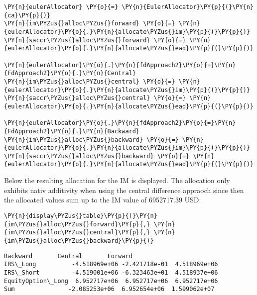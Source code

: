     \begin{tcolorbox}[breakable, size=fbox, boxrule=1pt, pad at break*=1mm,colback=cellbackground, colframe=cellborder]
\begin{Verbatim}[commandchars=\\\{\}]
\PY{n}{eulerAllocator} \PY{o}{=} \PY{n}{EulerAllocator}\PY{p}{(}\PY{n}{ca}\PY{p}{)}
\PY{n}{im\PYZus{}alloc\PYZus{}forward} \PY{o}{=} \PY{n}{eulerAllocator}\PY{o}{.}\PY{n}{allocate\PYZus{}im}\PY{p}{(}\PY{p}{)}
\PY{n}{saccr\PYZus{}alloc\PYZus{}forward} \PY{o}{=} \PY{n}{eulerAllocator}\PY{o}{.}\PY{n}{allocate\PYZus{}ead}\PY{p}{(}\PY{p}{)}

\PY{n}{eulerAllocator}\PY{o}{.}\PY{n}{fdApproach2}\PY{o}{=}\PY{n}{FdApproach2}\PY{o}{.}\PY{n}{Central}
\PY{n}{im\PYZus{}alloc\PYZus{}central} \PY{o}{=} \PY{n}{eulerAllocator}\PY{o}{.}\PY{n}{allocate\PYZus{}im}\PY{p}{(}\PY{p}{)}
\PY{n}{saccr\PYZus{}alloc\PYZus{}central} \PY{o}{=} \PY{n}{eulerAllocator}\PY{o}{.}\PY{n}{allocate\PYZus{}ead}\PY{p}{(}\PY{p}{)}

\PY{n}{eulerAllocator}\PY{o}{.}\PY{n}{fdApproach2}\PY{o}{=}\PY{n}{FdApproach2}\PY{o}{.}\PY{n}{Backward}
\PY{n}{im\PYZus{}alloc\PYZus{}backward} \PY{o}{=} \PY{n}{eulerAllocator}\PY{o}{.}\PY{n}{allocate\PYZus{}im}\PY{p}{(}\PY{p}{)}
\PY{n}{saccr\PYZus{}alloc\PYZus{}backward} \PY{o}{=} \PY{n}{eulerAllocator}\PY{o}{.}\PY{n}{allocate\PYZus{}ead}\PY{p}{(}\PY{p}{)}
\end{Verbatim}
\end{tcolorbox}

    Below the resulting allocation for the IM is displayed. The allocation
only exhibits nativ additivity when using the central difference
appraoch since then the allocated values sum up to the IM value of
6952717.39 USD.

    
    \begin{tcolorbox}[breakable, size=fbox, boxrule=1pt, pad at break*=1mm,colback=cellbackground, colframe=cellborder]
\begin{Verbatim}[commandchars=\\\{\}]
\PY{n}{display\PYZus{}table}\PY{p}{(}\PY{n}{im\PYZus{}alloc\PYZus{}forward}\PY{p}{,} \PY{n}{im\PYZus{}alloc\PYZus{}central}\PY{p}{,} \PY{n}{im\PYZus{}alloc\PYZus{}backward}\PY{p}{)}
\end{Verbatim}
\end{tcolorbox}

            \begin{tcolorbox}[breakable, size=fbox, boxrule=.5pt, pad at break*=1mm, opacityfill=0]
\begin{Verbatim}[commandchars=\\\{\}]
                       Backward       Central       Forward
IRS\_Long          -4.518969e+06 -2.421718e-01  4.518969e+06
IRS\_Short         -4.519001e+06 -6.323463e+01  4.518937e+06
EquityOption\_Long  6.952717e+06  6.952717e+06  6.952717e+06
Sum               -2.085253e+06  6.952654e+06  1.599062e+07
\end{Verbatim}
\end{tcolorbox}
        
